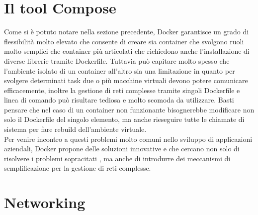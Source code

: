 \section{Il tool Compose}
Come si è potuto notare nella sezione precedente, Docker garantisce un grado di flessibilità molto elevato che consente di creare sia container che svolgono ruoli molto semplici che container più articolati che richiedono anche l'installazione di diverse
librerie tramite Dockerfile. Tuttavia può capitare molto spesso che l'ambiente isolato di un container all'altro sia una limitazione in quanto per svolgere determinati task due o più macchine virtuali devono potere comunicare efficacemente, inoltre la gestione
di reti complesse tramite singoli Dockerfile e linea di comando può risultare tediosa e molto scomoda da utilizzare. Basti pensare che nel caso di un container non funzionante bisognerebbe modificare non solo il Dockerfile del singolo elemento, ma anche rieseguire tutte le chiamate
di sistema per fare rebuild dell'ambiente virtuale. \\
Per venire incontro a questi problemi molto comuni nello sviluppo di applicazioni aziendali, Docker propone delle soluzioni innovative e che cercano non solo di risolvere i problemi sopracitati , ma anche di introdurre dei meccanismi di semplificazione per la gestione di reti complesse.




\section{Networking}
